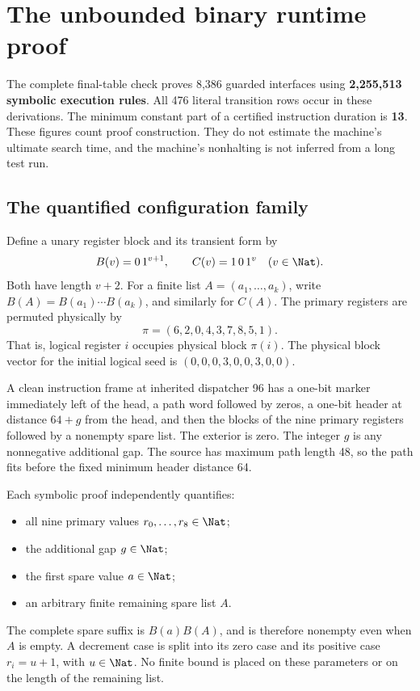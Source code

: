 \section{The unbounded binary runtime proof}
\label{sec:runtime}

The complete final-table check proves 8,386 guarded interfaces using
\textbf{2,255,513 symbolic execution rules}. All 476 literal transition
rows occur in these derivations. The minimum constant part of a
certified instruction duration is \textbf{13}. These figures count
proof construction. They do not estimate the machine's ultimate search
time, and the machine's nonhalting is not inferred from a long test run.

\subsection{The quantified configuration family}

Define a unary register block and its transient form by
\[
 B(v)=0\,1^{v+1},\qquad C(v)=1\,0\,1^v
 \quad(v\in\Nat).
\]
Both have length $v+2$. For a finite list $A=(a_1,\ldots,a_k)$,
write $B(A)=B(a_1)\cdots B(a_k)$, and similarly for $C(A)$.
The primary registers are permuted physically by
\[
 \pi=(6,2,0,4,3,7,8,5,1).
\]
That is, logical register $i$ occupies physical block $\pi(i)$.
The physical block vector for the initial logical seed is
$(0,0,0,3,0,0,3,0,0)$.

A clean instruction frame at inherited dispatcher 96 has a one-bit
marker immediately left of the head, a path word followed by zeros,
a one-bit header at distance $64+g$ from the head, and then the
blocks of the nine primary registers followed by a nonempty spare
list. The exterior is zero. The integer $g$ is any nonnegative
additional gap. The source has maximum path length 48, so the path
fits before the fixed minimum header distance 64.

Each symbolic proof independently quantifies:
\begin{itemize}
\item all nine primary values $r_0,\ldots,r_8\in\Nat$;
\item the additional gap $g\in\Nat$;
\item the first spare value $a\in\Nat$;
\item an arbitrary finite remaining spare list $A$.
\end{itemize}
The complete spare suffix is $B(a)B(A)$, and is therefore nonempty
even when $A$ is empty. A decrement case is split into its zero
case and its positive case $r_i=u+1$, with $u\in\Nat$.
No finite bound is placed on these parameters or on the length of
the remaining list.


